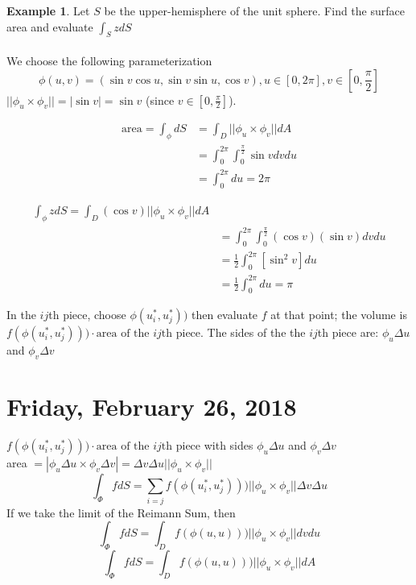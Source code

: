 \documentclass[12pt]{article}
\theoremstyle{plain}
\theoremstyle{definition}
\newtheorem{example}[theorem]{Example}
\begin{document}
\begin{example}
	Let $S$ be the upper-hemisphere of the unit sphere. Find the surface area and evaluate $\int_S z dS$\\
	\\
	We choose the following parameterization
	$$\phi (u,v) = (\sin v \cos u, \sin v \sin u, \cos v), u\in [0,2\pi], v\in [0,\frac{\pi}{2}]$$
	$||\phi_u \times \phi_v||=|\sin v|=\sin v$ (since $v\in [0,\frac{\pi}{2}]$).

	\begin{align*}
		\text{area} = \int_\phi dS &= \int_D ||\phi_u \times \phi_v|| dA\\
		&= \int^{2\pi}_0 \int_0^\frac{\pi}{2} \sin v dv du\\
		&= \int^{2\pi}_0 du = 2\pi
	\end{align*}

	\begin{align*}
		\int_\phi z dS = \int_D (\cos v) ||\phi_u \times \phi_v|| dA\\
		&= \int^{2\pi}_0 \int_0^\frac{\pi}{2} (\cos v)(\sin v) dv du\\
		&= \frac{1}{2} \int^{2\pi}_0 [\sin^2 v] du\\
		&= \frac{1}{2} \int^{2\pi}_0 du = \pi
	\end{align*}
\end{example}

In the $ij$th piece, choose $\phi (u_i^*, u_j^*))$ then evaluate $f$ at that point; the volume is $f(\phi (u_i^*, u_j^*)))\cdot \text{area of the $ij$th piece}$. The sides of the the $ij$th piece are: $\phi_u \Delta u$ and $\phi_v \Delta v$
\newpage

\section{Friday, February 26, 2018}

$f(\phi (u_i^*, u_j^*)))\cdot \text{area of the $ij$th piece}$ with sides $\phi_u \Delta u$ and $\phi_v \Delta v$\\
area $= |\phi_u \Delta u \times \phi_v \Delta v| = \Delta v \Delta u ||\phi_u \times \phi_v||$\\

$$\int_\Phi f dS = \sum_{i=j} f(\phi (u_i^*, u_j^*))) ||\phi_u \times \phi_v|| \Delta v \Delta u $$
If we take the limit of the Reimann Sum, then
$$\int_\Phi f dS = \int_D f(\phi (u, u))) ||\phi_u \times \phi_v|| d v d u$$
$$\int_\Phi f dS = \int_D f(\phi (u, u))) ||\phi_u \times \phi_v|| dA$$
\end{document}
